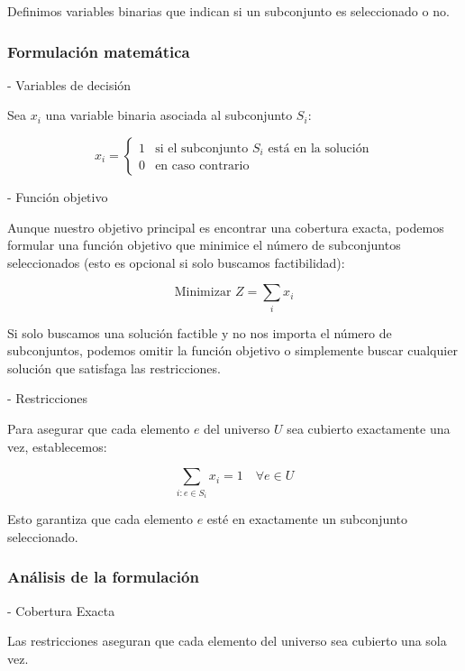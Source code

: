 \documentclass{article}
\begin{document}
Definimos variables binarias que indican si un subconjunto es seleccionado o no.

\subsubsection{Formulación matemática}

- Variables de decisión

Sea $x_i$ una variable binaria asociada al subconjunto $S_i$:

\begin{equation}
x_i = \begin{cases}
1 & \text{si el subconjunto } S_i \text{ está en la solución} \\
0 & \text{en caso contrario}
\end{cases}
\end{equation}

- Función objetivo

Aunque nuestro objetivo principal es encontrar una cobertura exacta, podemos formular una función objetivo que minimice el número de subconjuntos seleccionados (esto es opcional si solo buscamos factibilidad):

\begin{equation}
\text{Minimizar } Z = \sum_i x_i
\end{equation}

Si solo buscamos una solución factible y no nos importa el número de subconjuntos, podemos omitir la función objetivo o simplemente buscar cualquier solución que satisfaga las restricciones.

- Restricciones

Para asegurar que cada elemento $e$ del universo $U$ sea cubierto exactamente una vez, establecemos:

\begin{equation}
\sum_{i: e \in S_i} x_i = 1 \quad \forall e \in U
\end{equation}

Esto garantiza que cada elemento $e$ esté en exactamente un subconjunto seleccionado.

\subsubsection{Análisis de la formulación}

- Cobertura Exacta

Las restricciones aseguran que cada elemento del universo sea cubierto una sola vez.
\end{document}
